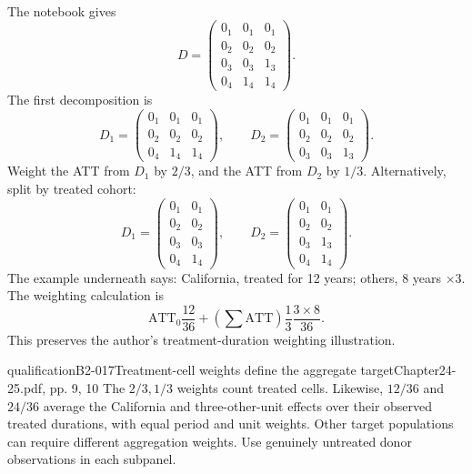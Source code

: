 \paragraph{}
The notebook gives
\[
D=\begin{pmatrix}
0_1&0_1&0_1\\0_2&0_2&0_2\\0_3&0_3&1_3\\0_4&1_4&1_4
\end{pmatrix}.
\]
The first decomposition is
\[
D_1=\begin{pmatrix}0_1&0_1&0_1\\0_2&0_2&0_2\\0_4&1_4&1_4\end{pmatrix},
\qquad
D_2=\begin{pmatrix}0_1&0_1&0_1\\0_2&0_2&0_2\\0_3&0_3&1_3\end{pmatrix}.
\]
Weight the ATT from \(D_1\) by \(2/3\), and the ATT from \(D_2\) by \(1/3\).
 Alternatively, split by treated cohort:
\[
D_1=\begin{pmatrix}0_1&0_1\\0_2&0_2\\0_3&0_3\\0_4&1_4\end{pmatrix},
\qquad
D_2=\begin{pmatrix}0_1&0_1\\0_2&0_2\\0_3&1_3\\0_4&1_4\end{pmatrix}.
\]
The example underneath says: California, treated for 12 years; others, 8 years \(\times3\). The weighting calculation is
\[
\mathrm{ATT}_0\frac{12}{36}
+\left(\sum\mathrm{ATT}\right)\frac13\frac{3\times8}{36}.
\]
This preserves the author's treatment-duration weighting illustration.
\begin{reviewnote}{qualification}{B2-017}{Treatment-cell weights define the aggregate target}{Chapter24-25.pdf, pp. 9, 10}
The \(2/3,1/3\) weights count treated cells. Likewise, \(12/36\) and \(24/36\) average the California and three-other-unit effects over their observed treated durations, with equal period and unit weights. Other target populations can require different aggregation weights. Use genuinely untreated donor observations in each subpanel.
\par{}
\end{reviewnote}



